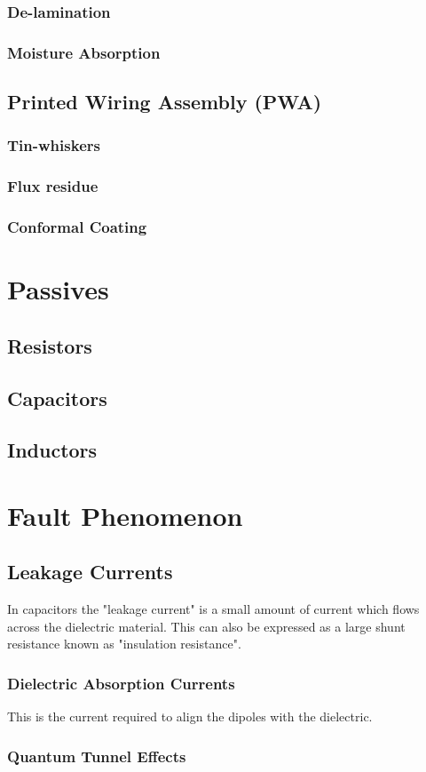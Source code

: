 \documentclass{article}
\begin{document}
		\subsubsection{De-lamination}
		\subsubsection{Moisture Absorption}

	\subsection{Printed Wiring Assembly (PWA)}
		\subsubsection{Tin-whiskers}
		\subsubsection{Flux residue}
		\subsubsection{Conformal Coating}

\newpage

\section{Passives}
	\subsection{Resistors}
	
	\subsection{Capacitors}
	
	\subsection{Inductors}
	
\newpage

\section{Fault Phenomenon}
	\subsection{Leakage Currents}
	In capacitors the "leakage current" is a small amount of current which flows across the dielectric material. This can also be expressed as a large shunt resistance known as "insulation resistance".
	
	\subsubsection{Dielectric Absorption Currents}
	This is the current required to align the dipoles with the dielectric.
	
	\subsubsection{Quantum Tunnel Effects}


\newpage

\printbibliography
\end{document}
